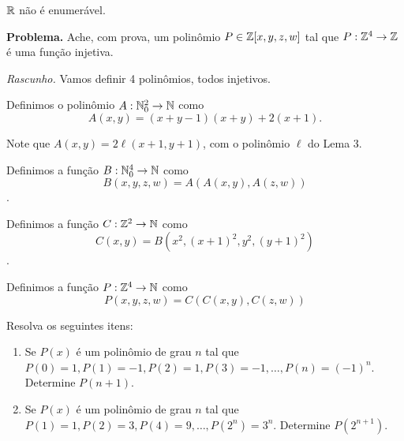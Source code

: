 \documentclass[10pt, a4paper]{article}
\begin{document}
	\begin{lem}[Extra]
		$\mathbb{R}$ não é enumerável.
	\end{lem}

\newpage
	\noindent \textbf{Problema.}
		Ache, com prova, um polinômio $P \in \mathbb{Z}[x, y, z, w]$ tal que $P: \mathbb{Z}^4 \to \mathbb{Z}$ é uma função injetiva.

		\noindent \textit{Rascunho.}
		Vamos definir 4 polinômios, todos injetivos.

		Definimos o polinômio $A: \mathbb{N}_0^2 \to \mathbb{N}$ como \[A(x, y) = (x+y-1)(x+y) + 2(x+1).\]

		\begin{rem}
			Note que $A(x, y) = 2\ell(x+1, y+1)$, com o polinômio $\ell$ do Lema 3.
		\end{rem}

		Definimos a função $B: \mathbb{N}_0^4 \to \mathbb{N}$ como \[B(x, y, z, w) = A(A(x, y), A(z, w))\].

		Definimos a função $C: \mathbb{Z}^2 \to \mathbb{N}$ como \[C(x, y) = B(x^2, (x+1)^2, y^2, (y+1)^2)\].

		Definimos a função $P: \mathbb{Z}^4 \to \mathbb{N}$ como \[P(x, y, z, w) = C(C(x, y), C(z, w))\]

		\newpage

	\begin{prob}
		Resolva os seguintes itens:
		\begin{enumerate}[label = \textbf{\color{main} (\alph*)}]
			\item Se $P(x)$ é um polinômio de grau $n$ tal que $P(0) = 1, P (1) = -1, P (2) = 1, P (3) = -1, \dots, P (n) = (-1)^n$. Determine $P(n + 1)$.
			\item Se $P(x)$ é um polinômio de grau $n$ tal que $P(1) = 1, P (2) = 3, P(4) = 9, \dots, P (2^n) = 3^n$. Determine $P (2^{n+1} )$.
		\end{enumerate}
	\end{prob}
\end{document}
